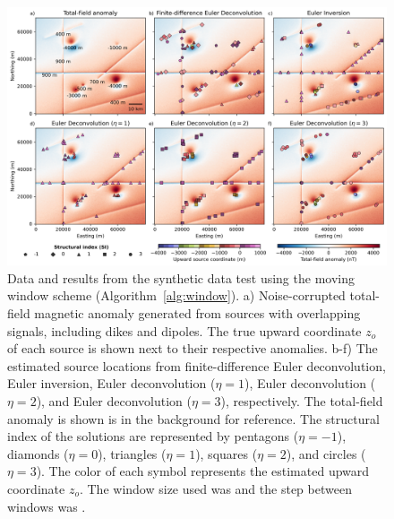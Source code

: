 \begin{figure}[tb!]
\centering
\includegraphics[width=1\linewidth]{figures/synthetic-windows.png}
\caption{
    Data and results from the synthetic data test using the moving window scheme (Algorithm~\ref{alg:window}).
    a) Noise-corrupted total-field magnetic anomaly generated from \SynWinNSources{} sources with overlapping signals, including dikes and dipoles. The true upward coordinate $z_o$ of each source is shown next to their respective anomalies.
    b-f) The estimated source locations from finite-difference Euler deconvolution, Euler inversion, Euler deconvolution ($\eta=1$), Euler deconvolution ($\eta=2$), and Euler deconvolution ($\eta=3$), respectively. The total-field anomaly is shown is in the background for reference.
    The structural index of the solutions are represented by pentagons ($\eta=-1$),  diamonds ($\eta=0$),  triangles ($\eta=1$),  squares ($\eta=2$), and circles ($\eta=3$). 
    The color of each symbol represents the estimated upward coordinate $z_o$. 
    The window size used was \SynWinWindowSize{} and the step between windows was \SynWinWindowStep{}.
}
\label{fig:windows}
\end{figure}

